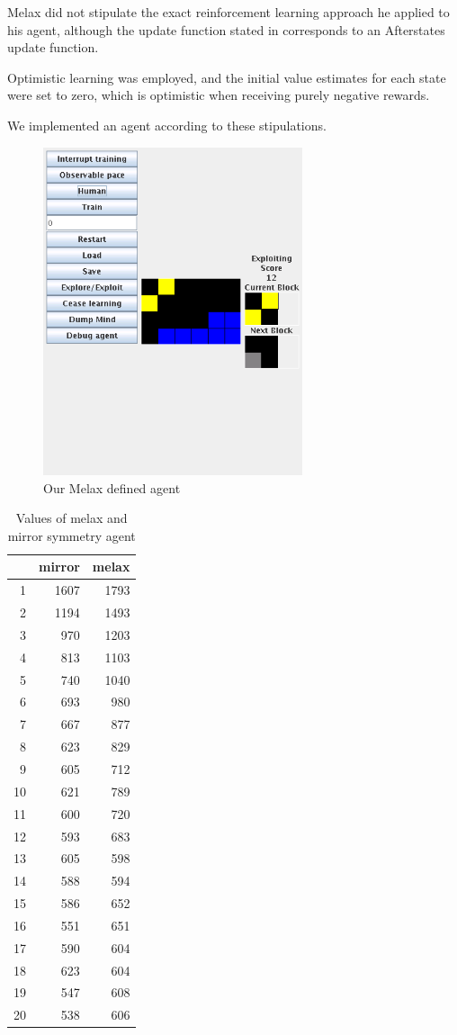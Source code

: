 \documentclass{rucsthesis}
\begin{document}
Melax did not stipulate the exact reinforcement learning approach he applied to his agent, although the update function stated in \cite{melaxtetris} corresponds to an Afterstates update function.

Optimistic learning was employed, and the initial value estimates for each state were set to zero, which is optimistic when receiving purely negative rewards.

We implemented an agent according to these stipulations.

\begin{figure}[h]
\centering
\includegraphics[width=3in]{mymelax.png}
\caption{Our Melax defined agent}
\label{fig:mymelax}
\end{figure}

\begin{table}[h]
\centering
\begin{tabular}{|r|r|r|}
\hline
	&	mirror	&	melax \\	
\hline
1	&	1607	&	1793	\\
\hline
2	&	1194	&	1493	\\
\hline
3	&	970	&	1203	\\
\hline
4	&	813	&	1103	\\
\hline
5	&	740	&	1040	\\
\hline
6	&	693	&	980	\\
\hline
7	&	667	&	877	\\
\hline
8	&	623	&	829	\\
\hline
9	&	605	&	712	\\
\hline
10	&	621	&	789	\\
\hline
11	&	600	&	720	\\
\hline
12	&	593	&	683	\\
\hline
13	&	605	&	598	\\
\hline
14	&	588	&	594	\\
\hline
15	&	586	&	652	\\
\hline
16	&	551	&	651	\\
\hline
17	&	590	&	604	\\
\hline
18	&	623	&	604	\\
\hline
19	&	547	&	608	\\
\hline
20	&	538	&	606	\\
\hline
\end{tabular}
\caption{Values of melax and mirror symmetry agent}
\end{table}
\end{document}
